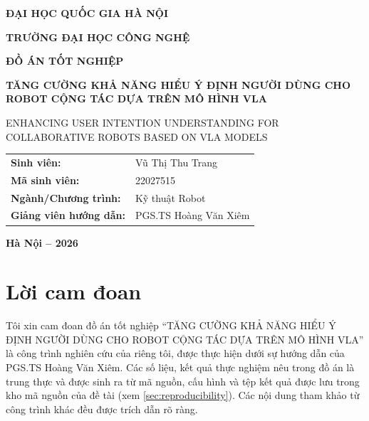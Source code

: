\documentclass[12pt,a4paper]{report}
\newcommand{\UniversityName}{ĐẠI HỌC QUỐC GIA HÀ NỘI}
\newcommand{\SchoolName}{TRƯỜNG ĐẠI HỌC CÔNG NGHỆ}
\newcommand{\ThesisTitle}{TĂNG CƯỜNG KHẢ NĂNG HIỂU Ý ĐỊNH NGƯỜI DÙNG CHO ROBOT CỘNG TÁC DỰA TRÊN MÔ HÌNH VLA}
\newcommand{\ThesisTitleEN}{ENHANCING USER INTENTION UNDERSTANDING FOR COLLABORATIVE ROBOTS BASED ON VLA MODELS}
\newcommand{\StudentName}{Vũ Thị Thu Trang}
\newcommand{\StudentID}{22027515}
\newcommand{\SupervisorName}{PGS.TS Hoàng Văn Xiêm}
\newcommand{\MajorName}{Kỹ thuật Robot}
\newcommand{\ThesisYear}{2026}
\begin{document}
\begin{titlepage}
    \centering
    \vspace*{0.8cm}
    {\bfseries\large \UniversityName\par}
    \vspace{0.25cm}
    {\bfseries\large \SchoolName\par}

    \vspace{2cm}
    {\bfseries\Large ĐỒ ÁN TỐT NGHIỆP\par}

    \vspace{1.5cm}
    {\bfseries\LARGE \ThesisTitle\par}
    \vspace{0.5cm}
    {\large \ThesisTitleEN\par}

    \vfill
    \begin{tabular}{>{\bfseries}p{4.8cm}p{8.3cm}}
        Sinh viên: & \StudentName \\[0.35cm]
        Mã sinh viên: & \StudentID \\[0.35cm]
        Ngành/Chương trình: & \MajorName \\[0.35cm]
        Giảng viên hướng dẫn: & \SupervisorName \\
    \end{tabular}
    

    \vfill
    {\bfseries Hà Nội -- \ThesisYear\par}
\end{titlepage}


\chapter*{Lời cam đoan}

Tôi xin cam đoan đồ án tốt nghiệp ``\ThesisTitle'' là công trình nghiên cứu của riêng tôi, được thực hiện dưới sự hướng dẫn của \SupervisorName. Các số liệu, kết quả thực nghiệm nêu trong đồ án là trung thực và được sinh ra từ mã nguồn, cấu hình và tệp kết quả được lưu trong kho mã nguồn của đề tài (xem \cref{sec:reproducibility}). Các nội dung tham khảo từ công trình khác đều được trích dẫn rõ ràng.
\end{document}
